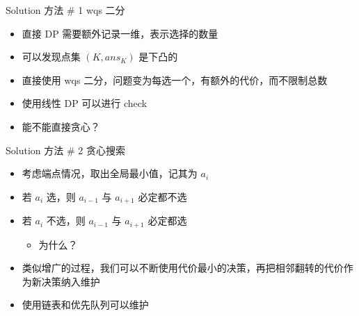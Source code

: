﻿\documentclass[aspectratio=169,handout]{ctexbeamer}
\begin{document}
\begin{frame}{Solution}
    方法 \# 1 wqs 二分
    \begin{itemize}
        \item 直接 DP 需要额外记录一维，表示选择的数量
        \item 可以发现点集 $(K,ans_K)$ 是下凸的
        \item 直接使用 wqs 二分，问题变为每选一个，有额外的代价，而不限制总数
        \item 使用线性 DP 可以进行 check
        \item 能不能直接贪心？
    \end{itemize}
\end{frame}
\begin{frame}{Solution}
    方法 \# 2 贪心搜索
    \begin{itemize}
        \item 考虑端点情况，取出全局最小值，记其为 $a_i$
        \item 若 $a_i$ 选，则 $a_{i-1}$ 与 $a_{i+1}$ 必定都不选
        \item 若 $a_i$ 不选，则 $a_{i-1}$ 与 $a_{i+1}$ 必定都选
        \begin{itemize}
            \item 为什么？
        \end{itemize}
        \item 类似增广的过程，我们可以不断使用代价最小的决策，再把相邻翻转的代价作为新决策纳入维护
        \item 使用链表和优先队列可以维护
    \end{itemize}
\end{frame}














\end{document}
